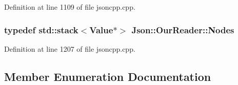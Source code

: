 Definition at line 1109 of file jsoncpp.\+cpp.

\subsubsection[{\texorpdfstring{Nodes}{Nodes}}]{\setlength{\rightskip}{0pt plus 5cm}typedef std\+::stack$<$Value$\ast$$>$ {\bf Json\+::\+Our\+Reader\+::\+Nodes}\hspace{0.3cm}{\ttfamily [private]}}\hypertarget{class_json_1_1_our_reader_a8480a5ef159cee3a090f96358414d8d3}{}\label{class_json_1_1_our_reader_a8480a5ef159cee3a090f96358414d8d3}


Definition at line 1207 of file jsoncpp.\+cpp.



\subsection{Member Enumeration Documentation}
